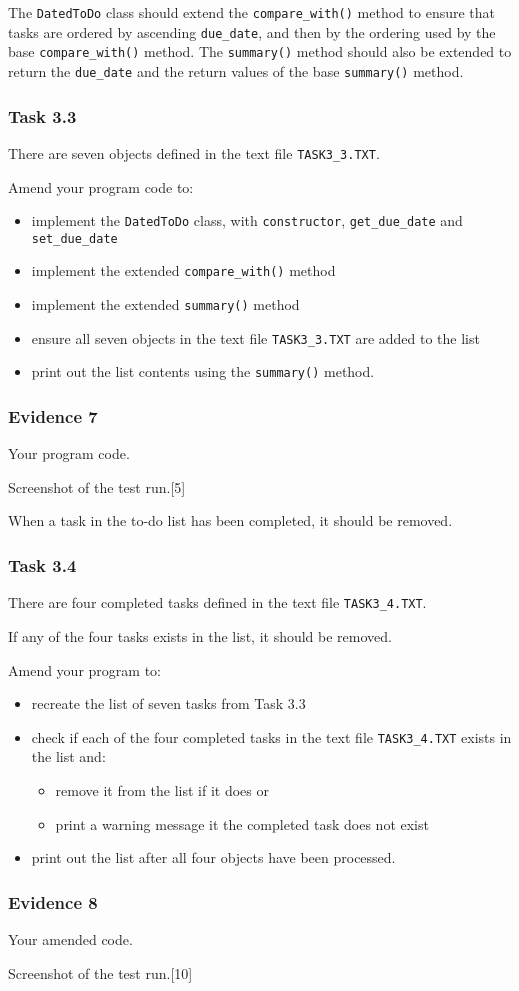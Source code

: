 The \texttt{DatedToDo} class should extend the \texttt{compare\_with()}
method to ensure that tasks are ordered by ascending \texttt{due\_date},
and then by the ordering used by the base \texttt{compare\_with()}
method. The \texttt{summary()} method should also be extended to return
the \texttt{due\_date} and the return values of the base \texttt{summary()}
method.

\subsubsection*{Task 3.3}

There are seven objects defined in the text file \texttt{TASK3\_3.TXT}.

Amend your program code to:
\begin{itemize}
\item implement the \texttt{DatedToDo} class, with \texttt{constructor},
\texttt{get\_due\_date} and \texttt{set\_due\_date}
\item implement the extended \texttt{compare\_with()} method
\item implement the extended \texttt{summary()} method
\item ensure all seven objects in the text file \texttt{TASK3\_3.TXT} are
added to the list
\item print out the list contents using the \texttt{summary()} method.
\end{itemize}

\subsubsection*{Evidence 7}

Your program code. 

Screenshot of the test run.\hfill{}{[}5{]}

\noindent When a task in the to-do list has been completed, it should
be removed.

\subsubsection*{Task 3.4}

There are four completed tasks defined in the text file \texttt{TASK3\_4.TXT}.

If any of the four tasks exists in the list, it should be removed.

Amend your program to: 
\begin{itemize}
\item recreate the list of seven tasks from Task 3.3
\item check if each of the four completed tasks in the text file \texttt{TASK3\_4.TXT}
exists in the list and: 
\begin{itemize}
\item remove it from the list if it does or 
\item print a warning message it the completed task does not exist
\end{itemize}
\item print out the list after all four objects have been processed. 
\end{itemize}

\subsubsection*{Evidence 8}

Your amended code.

Screenshot of the test run.\hfill{}{[}10{]}